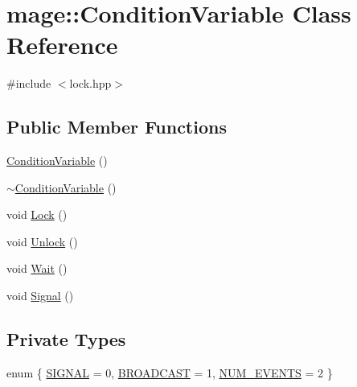 \hypertarget{classmage_1_1_condition_variable}{}\section{mage\+:\+:Condition\+Variable Class Reference}
\label{classmage_1_1_condition_variable}


{\ttfamily \#include $<$lock.\+hpp$>$}

\subsection*{Public Member Functions}
\begin{DoxyCompactItemize}
\item 
\hyperlink{classmage_1_1_condition_variable_a09073f0affc601f052fce541a17ba559}{Condition\+Variable} ()
\item 
\hyperlink{classmage_1_1_condition_variable_accd5253beb65b2904428afdb889cf00b}{$\sim$\+Condition\+Variable} ()
\item 
void \hyperlink{classmage_1_1_condition_variable_acb0fa4a842b6979ac35c70dab0f43813}{Lock} ()
\item 
void \hyperlink{classmage_1_1_condition_variable_a3b3fe63417b7d7adedc9fe015fc7feea}{Unlock} ()
\item 
void \hyperlink{classmage_1_1_condition_variable_abc279c54285145d981f409c2d110c85a}{Wait} ()
\item 
void \hyperlink{classmage_1_1_condition_variable_a09e52f0d51c10ee565a895d2444175d9}{Signal} ()
\end{DoxyCompactItemize}
\subsection*{Private Types}
\begin{DoxyCompactItemize}
\item 
enum \{ \hyperlink{classmage_1_1_condition_variable_a600fb5094237230f6b260b31d6fb0945a83361ddf52d1973875f7a48ac4bccf94}{S\+I\+G\+N\+AL} = 0, 
\hyperlink{classmage_1_1_condition_variable_a600fb5094237230f6b260b31d6fb0945a5863233d3c1e62ca806753b0d175199f}{B\+R\+O\+A\+D\+C\+A\+ST} = 1, 
\hyperlink{classmage_1_1_condition_variable_a600fb5094237230f6b260b31d6fb0945a2c43161b9ddfb393865606bfb3a51fac}{N\+U\+M\+\_\+\+E\+V\+E\+N\+TS} = 2
 \}
\end{DoxyCompactItemize}

